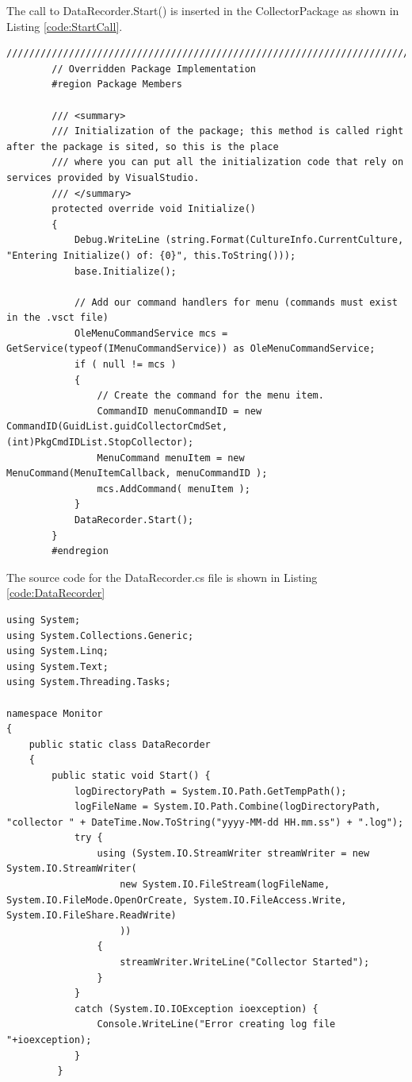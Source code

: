 \begin{Answer}

The call to DataRecorder.Start() is inserted in the CollectorPackage as shown in Listing \ref{code:StartCall}.
\begin{lstlisting}[caption=Call to DataRecorder.Start(),label=code:StartCall]
        /////////////////////////////////////////////////////////////////////////////
        // Overridden Package Implementation
        #region Package Members

        /// <summary>
        /// Initialization of the package; this method is called right after the package is sited, so this is the place
        /// where you can put all the initialization code that rely on services provided by VisualStudio.
        /// </summary>
        protected override void Initialize()
        {
            Debug.WriteLine (string.Format(CultureInfo.CurrentCulture, "Entering Initialize() of: {0}", this.ToString()));
            base.Initialize();

            // Add our command handlers for menu (commands must exist in the .vsct file)
            OleMenuCommandService mcs = GetService(typeof(IMenuCommandService)) as OleMenuCommandService;
            if ( null != mcs )
            {
                // Create the command for the menu item.
                CommandID menuCommandID = new CommandID(GuidList.guidCollectorCmdSet, (int)PkgCmdIDList.StopCollector);
                MenuCommand menuItem = new MenuCommand(MenuItemCallback, menuCommandID );
                mcs.AddCommand( menuItem );
            }
            DataRecorder.Start();
        }
        #endregion
\end{lstlisting}

The source code for the DataRecorder.cs file is shown in Listing \ref{code:DataRecorder}
\begin{lstlisting}[caption=Data Recorder Class,  label=code:DataRecorder]
using System;
using System.Collections.Generic;
using System.Linq;
using System.Text;
using System.Threading.Tasks;

namespace Monitor
{
    public static class DataRecorder
    {
        public static void Start() {
            logDirectoryPath = System.IO.Path.GetTempPath();
            logFileName = System.IO.Path.Combine(logDirectoryPath, "collector " + DateTime.Now.ToString("yyyy-MM-dd HH.mm.ss") + ".log");
            try {
                using (System.IO.StreamWriter streamWriter = new System.IO.StreamWriter(
                    new System.IO.FileStream(logFileName, System.IO.FileMode.OpenOrCreate, System.IO.FileAccess.Write, System.IO.FileShare.ReadWrite)
                    ))
                {
                    streamWriter.WriteLine("Collector Started");
                }
            } 
            catch (System.IO.IOException ioexception) {
                Console.WriteLine("Error creating log file "+ioexception);
            }
         }


\end{lstlisting}
\end{Answer}
